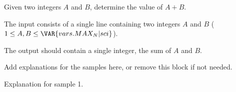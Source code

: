 

Given two integers $A$ and $B$, determine the value of $A + B$.

The input consists of a single line containing two integers
$A$ and $B$ ($1 \leq A, B \leq \VAR{vars.MAX_N | sci}$).

The output should contain a single integer, the sum of $A$ and $B$.

Add explanations for the samples here, or remove this block if not needed.

Explanation for sample 1.
